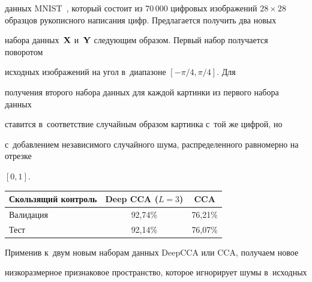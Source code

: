 данных MNIST~\cite{MNIST}, который состоит из 70\,000 цифровых изображений $28 

\times 28$ образцов рукописного написания цифр. Предлагается получить два новых 

набора данных~$\mathbf{X}$ и~$\mathbf{Y}$ следующим образом. Первый набор получается поворотом 

исходных изображений на угол в~диапазоне $[{-\pi}/{4}, {\pi}/{4}]$. Для 

получения второго набора данных для каждой картинки из первого набора данных 

ставится в~соответствие случайным образом картинка с~той же цифрой, но 

с~добавлением независимого случайного шума, распределенного равномерно на отрезке 

$[0,1]$.



\begin{table}\small %

\begin{center}

\parbox{240pt}{

}



\label{tbl:1}

\vspace*{2ex}



\begin{tabular}{|l|c|c|}

\hline

    Скользящий контроль & Deep CCA ($L=3$) & CCA \\  \hline

    Валидация & 92,74\%  &  76,21\%\\

    Тест & 92,14\% & 76,07\% \\

    \hline

\end{tabular}

\end{center}

\end{table}



Применив к~двум новым наборам данных DeepCCA или CCA, получаем новое 

низкоразмерное признаковое пространство, которое игнорирует шумы в~исходных 

